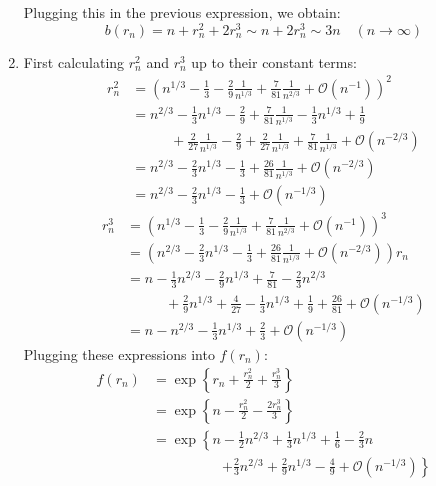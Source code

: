 \begin{solution}
\begin{enumerate}[label=(\alph*)]
        Plugging this in the previous expression, we obtain:
        \[
            b(r_n) = n + r_n^2 + 2r_n^3 \sim n + 2r_n^3 \sim 3n \quad (n\to \infty)
        \]
        \item First calculating $r_n^2$ and $r_n^3$ up to their constant terms:
        \begin{align*}
            r_n^2 &= \left(n^{1/3} - \frac{1}{3} - \frac{2}{9}\frac{1}{n^{1/3}} + \frac{7}{81}\frac{1}{n^{2/3}} + \mathcal{O}(n^{-1})\right)^2 \\
            &= n^{2/3} - \frac{1}{3}n^{1/3} - \frac{2}{9} + \frac{7}{81}\frac{1}{n^{1/3}} - \frac{1}{3}n^{1/3} + \frac{1}{9} \\
            &\mspace{50mu}+ \frac{2}{27}\frac{1}{n^{1/3}} - \frac{2}{9} + \frac{2}{27}\frac{1}{n^{1/3}} +\frac{7}{81}\frac{1}{n^{1/3}} + \mathcal{O}(n^{-2/3})\\
            &= n^{2/3} - \frac{2}{3}n^{1/3} - \frac{1}{3} + \frac{26}{81}\frac{1}{n^{1/3}}+ \mathcal{O}(n^{-2/3}) \\
            &= n^{2/3} - \frac{2}{3}n^{1/3} - \frac{1}{3} + \mathcal{O}(n^{-1/3})
        \end{align*}
        \begin{align*}
            r_n^3 &=  \left(n^{1/3} - \frac{1}{3} - \frac{2}{9}\frac{1}{n^{1/3}} + \frac{7}{81}\frac{1}{n^{2/3}} + \mathcal{O}(n^{-1})\right)^3 \\
            &= \left(n^{2/3} - \frac{2}{3}n^{1/3} - \frac{1}{3} + \frac{26}{81}\frac{1}{n^{1/3}}+ \mathcal{O}(n^{-2/3})\right)r_n \\
            &= n - \frac{1}{3}n^{2/3} - \frac{2}{9}n^{1/3} + \frac{7}{81} - \frac{2}{3}n^{2/3} \\
            &\mspace{50mu}+ \frac{2}{9}n^{1/3} + \frac{4}{27} - \frac{1}{3}n^{1/3} + \frac{1}{9} + \frac{26}{81} + \mathcal{O}(n^{-1/3}) \\
            &= n - n^{2/3} - \frac{1}{3}n^{1/3}  + \frac{2}{3} + \mathcal{O}(n^{-1/3})
        \end{align*}
        Plugging these expressions into $f(r_n)$:
        \begin{align*}
            f(r_n) &= \exp\left\{r_n + \frac{r_n^2}{2} + \frac{r_n^3}{3} \right\} \\
            &=\exp\left\{n - \frac{r_n^2}{2} - \frac{2r_n^3}{3} \right\} \\
            &= \exp\left\{n - \frac{1}{2}n^{2/3} + \frac{1}{3}n^{1/3} + \frac{1}{6} - \frac{2}{3}n \right. \\
            &\mspace{90mu} \left.+ \frac{2}{3}n^{2/3} + \frac{2}{9}n^{1/3} - \frac{4}{9} + \mathcal{O}(n^{-1/3})\right\} \\

\end{align*}
\end{enumerate}
\end{solution}
